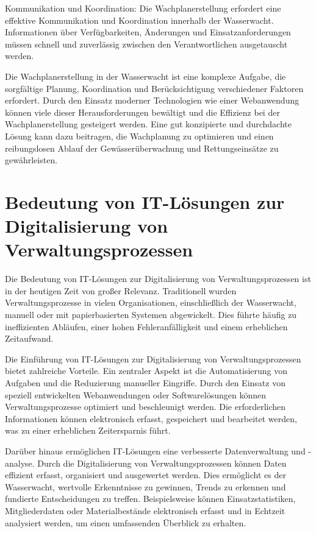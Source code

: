 \documentclass[fontsize=12pt,openright,oneside,paper=a4,BCOR=1cm]{scrbook}
\begin{document}
Kommunikation und Koordination: Die Wachplanerstellung erfordert eine effektive Kommunikation und Koordination innerhalb der Wasserwacht. Informationen über Verfügbarkeiten, Änderungen und Einsatzanforderungen müssen schnell und zuverlässig zwischen den Verantwortlichen ausgetauscht werden. 

Die Wachplanerstellung in der Wasserwacht ist eine komplexe Aufgabe, die sorgfältige Planung, Koordination und Berücksichtigung verschiedener Faktoren erfordert. Durch den Einsatz moderner Technologien wie einer Webanwendung können viele dieser Herausforderungen bewältigt und die Effizienz bei der Wachplanerstellung gesteigert werden. Eine gut konzipierte und durchdachte Lösung kann dazu beitragen, die Wachplanung zu optimieren und einen reibungslosen Ablauf der Gewässerüberwachung und Rettungseinsätze zu gewährleisten.

\section{Bedeutung von IT-Lösungen zur Digitalisierung von Verwaltungsprozessen} 

Die Bedeutung von IT-Lösungen zur Digitalisierung von Verwaltungsprozessen ist in der heutigen Zeit von großer Relevanz. Traditionell wurden Verwaltungsprozesse in vielen Organisationen, einschließlich der Wasserwacht, manuell oder mit papierbasierten Systemen abgewickelt. Dies führte häufig zu ineffizienten Abläufen, einer hohen Fehleranfälligkeit und einem erheblichen Zeitaufwand.

Die Einführung von IT-Lösungen zur Digitalisierung von Verwaltungsprozessen bietet zahlreiche Vorteile. Ein zentraler Aspekt ist die Automatisierung von Aufgaben und die Reduzierung manueller Eingriffe. Durch den Einsatz von speziell entwickelten Webanwendungen oder Softwarelösungen können Verwaltungsprozesse optimiert und beschleunigt werden. Die erforderlichen Informationen können elektronisch erfasst, gespeichert und bearbeitet werden, was zu einer erheblichen Zeitersparnis führt.

Darüber hinaus ermöglichen IT-Lösungen eine verbesserte Datenverwaltung und -analyse. Durch die Digitalisierung von Verwaltungsprozessen können Daten effizient erfasst, organisiert und ausgewertet werden. Dies ermöglicht es der Wasserwacht, wertvolle Erkenntnisse zu gewinnen, Trends zu erkennen und fundierte Entscheidungen zu treffen. Beispielsweise können Einsatzstatistiken, Mitgliederdaten oder Materialbestände elektronisch erfasst und in Echtzeit analysiert werden, um einen umfassenden Überblick zu erhalten.
\end{document}
